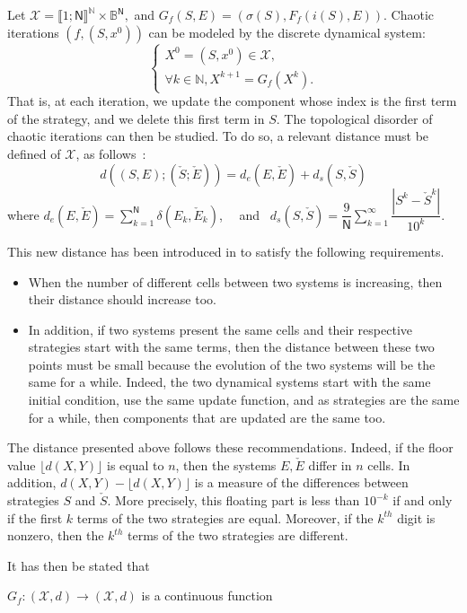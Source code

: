 Let $\mathcal{X} = \llbracket 1 ; \mathsf{N} \rrbracket^\mathds{N} \times \mathds{B}^\mathsf{N},$ and $G_f\left(S,E\right) = \left(\sigma(S), F_f(i(S),E)\right).$ 
Chaotic iterations $\left(f, (S,x^0)\right)$ can be modeled by the 
discrete dynamical system:
$$\left\{
\begin{array}{l}
X^0 = (S,x^0) \in \mathcal{X}, \\
\forall k \in \mathds{N}, X^{k+1} = G_f(X^k).
\end{array}
\right.$$
That is, at each iteration, we update the component whose index is the first term
of the strategy, and we delete this first term in $S$.
The topological disorder of chaotic iterations can then be studied.
To do so, a relevant distance must be defined of $\mathcal{X}$, as
follows~\cite{GuyeuxThese10,wang2009}:
$$d((S,E);(\check{S};\check{E})) = d_e(E,\check{E}) +  d_s(S,\check{S})$$
\noindent where $\displaystyle{d_e(E,\check{E}) = \sum_{k=1}^\mathsf{N} \delta (E_k, \check{E}_k)}$, ~~and~ $\displaystyle{d_s(S,\check{S}) = \dfrac{9}{\textsf{N}} \sum_{k = 1}^\infty \dfrac{|S^k-\check{S}^k|}{10^k}}$.

This new distance has been introduced in \cite{wang2009} to satisfy the following requirements.
\begin{itemize}
\item When the number of different cells between two systems is increasing, then their distance should increase too.
\item In addition, if two systems present the same cells and their respective strategies start with the same terms, then the distance between these two points must be small because the evolution of the two systems will be the same for a while. Indeed, the two dynamical systems start with the same initial condition, use the same update function, and as strategies are the same for a while, then components that are updated are the same too.
\end{itemize}
The distance presented above follows these recommendations. Indeed, if the floor value $\lfloor d(X,Y)\rfloor $ is equal to $n$, then the systems $E, \check{E}$ differ in $n$ cells. In addition, $d(X,Y) - \lfloor d(X,Y) \rfloor $ is a measure of the differences between strategies $S$ and $\check{S}$. More precisely, this floating part is less than $10^{-k}$ if and only if the first $k$ terms of the two strategies are equal. Moreover, if the $k^{th}$ digit is nonzero, then the $k^{th}$ terms of the two strategies are different.

It has then be stated that
\begin{proposition}
$G_f : (\mathcal{X},d) \to  (\mathcal{X},d)$ is a continuous function
\end{proposition}

